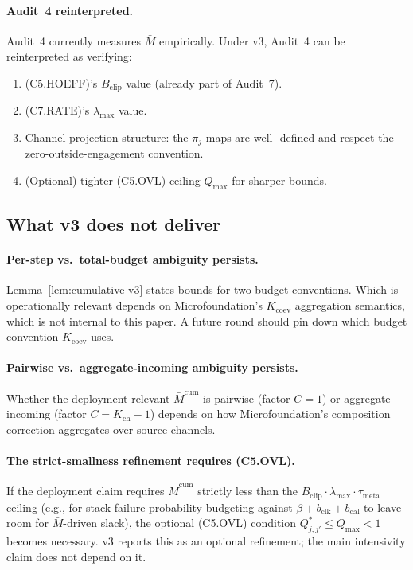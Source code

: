 \documentclass{article}
\newcommand{\Bclip}{B_{\mathrm{clip}}}
\newcommand{\Kch}{K_{\mathrm{ch}}}
\newcommand{\lammax}{\lambda_{\max}}
\newcommand{\taumeta}{\tau_{\mathrm{meta}}}
\newcommand{\bclk}{b_{\mathrm{clk}}}
\newcommand{\bcal}{b_{\mathrm{cal}}}
\begin{document}
\paragraph{Audit~4 reinterpreted.}  Audit~4 currently measures
$\bar{M}$ empirically.  Under v3, Audit~4 can be reinterpreted as
verifying:
\begin{enumerate}
\item (C5.HOEFF)'s $\Bclip$ value (already part of Audit~7).
\item (C7.RATE)'s $\lammax$ value.
\item Channel projection structure: the $\pi_j$ maps are well-
  defined and respect the zero-outside-engagement convention.
\item (Optional) tighter (C5.OVL) ceiling $Q_{\max}$ for sharper
  bounds.
\end{enumerate}

\subsection{What v3 does not deliver}

\paragraph{Per-step vs.\ total-budget ambiguity persists.}
Lemma~\ref{lem:cumulative-v3} states bounds for two budget
conventions.  Which is operationally relevant depends on
Microfoundation's $K_{\mathrm{coev}}$ aggregation semantics, which
is not internal to this paper.  A future round should pin down
which budget convention $K_{\mathrm{coev}}$ uses.

\paragraph{Pairwise vs.\ aggregate-incoming ambiguity persists.}
Whether the deployment-relevant $\bar{M}^{\mathrm{cum}}$ is
pairwise (factor $C = 1$) or aggregate-incoming (factor $C = \Kch
- 1$) depends on how Microfoundation's composition correction
aggregates over source channels.

\paragraph{The strict-smallness refinement requires (C5.OVL).}  If
the deployment claim requires $\bar{M}^{\mathrm{cum}}$ strictly
less than the $\Bclip \cdot \lammax \cdot \taumeta$ ceiling
(e.g., for stack-failure-probability budgeting against $\beta +
\bclk + \bcal$ to leave room for $\bar{M}$-driven slack), the
optional (C5.OVL) condition $Q^*_{j,j'} \leq Q_{\max} < 1$ becomes
necessary.  v3 reports this as an optional refinement; the main
intensivity claim does not depend on it.
\end{document}
